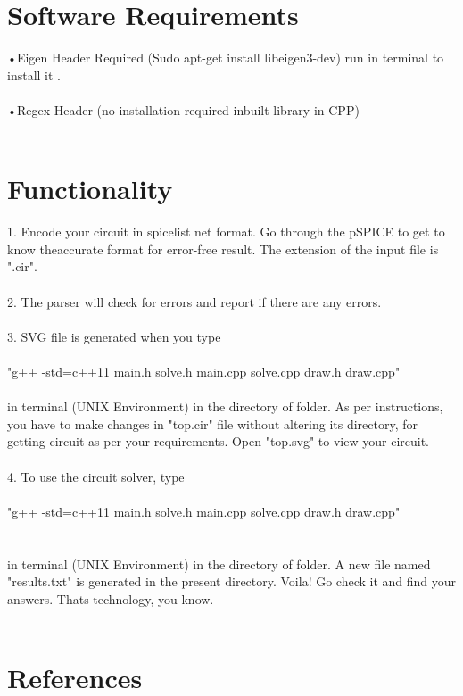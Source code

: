 \documentclass{scrreprt}
\begin{document}
\section{Software Requirements}
$ $\indent  •Eigen Header Required (Sudo apt-get install libeigen3-dev) run in terminal to \indent install it .\\
\\
\indent •Regex Header (no installation required inbuilt library in CPP)\\
\\
$ $
\section{Functionality}
$ $
\\ 1. Encode your circuit in spicelist net format. Go through the pSPICE to get to know theaccurate format for error-free result. The extension of the input file is ".cir". \\
\\
 2. The parser will check for errors and report if there are any errors.\\
\\
 3. SVG file is generated when you type \\
\\
\indent "g++ -std=c++11 main.h solve.h  main.cpp  solve.cpp draw.h draw.cpp" \\
\\
in terminal (UNIX Environment) in the directory of folder. As per instructions, you have to make changes in "top.cir" file without altering its directory, for getting circuit as per your requirements. Open "top.svg" to view your circuit.
\\
\\
 4. To use the circuit solver, type\\
\\
\indent "g++ -std=c++11 main.h solve.h  main.cpp  solve.cpp draw.h draw.cpp" \\
\\
\\in terminal (UNIX Environment) in the directory of folder. A new file named "results.txt" is generated in the present directory. Voila! Go check it and find your answers. Thats technology, you know.
\\
\\
\section{References}
\end{document}
